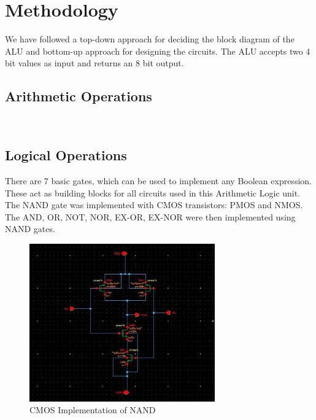 \documentclass[conference]{IEEEtran}
\begin{document}
\section{Methodology}\label{C}
We have followed a top-down approach for deciding the block diagram of the ALU and bottom-up approach for designing the circuits. The ALU accepts two 4 bit values as input and returns an 8 bit output.

\subsection{Arithmetic Operations}\label{CA}
\\
 
\subsection{Logical Operations}\label{CB}
There are 7 basic gates, which can be used to implement any Boolean expression. These act as building blocks for all circuits used in this Arithmetic Logic unit.\\
The NAND gate was implemented with CMOS transistors: PMOS and NMOS. The AND, OR, NOT, NOR, EX-OR, EX-NOR were then implemented using NAND gates.
\begin{figure}[htbp]
\centerline{\includegraphics[width=8cm,keepaspectratio,]{"1bit_NAND.png"}}
\caption{CMOS Implementation of NAND}
\label{fig2}
\end{figure}
\end{document}
